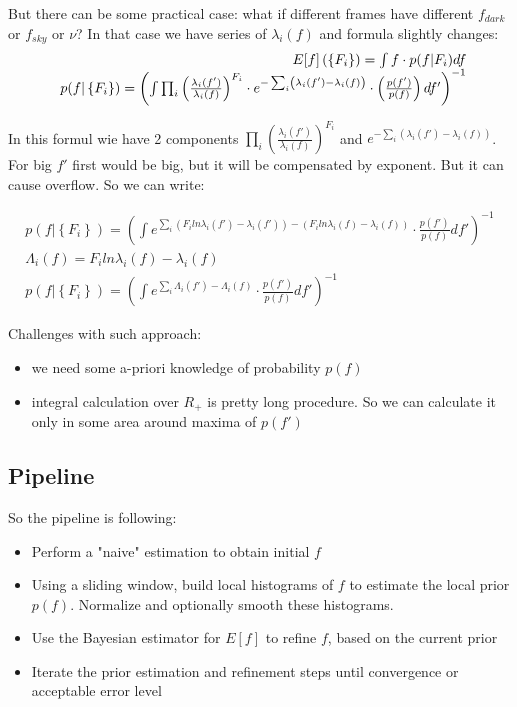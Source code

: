 \documentclass{article}
\begin{document}
But there can be some practical case: what if different frames have different $f_{dark}$ or $f_{sky}$ or $\nu$? In that case we have series
of $\lambda_i(f)$ and formula slightly changes:
\begin{equation}
\begin{array}{r@{}l}
    E[f]\left( \left\{ F_i \right\} \right) = \int f \cdot p(f | {F_i}) df \\
    p(f | \left\{ F_i \right\}) = \left( \int \prod_i \left( \frac{\lambda_i(f')}{\lambda_i(f)} \right)^{F_i} \cdot 
    e^{-\sum_i \left(\lambda_i(f')-\lambda_i(f)\right)} \cdot \left( \frac{p(f')}{p(f)} \right) df'\right)^{-1}
\end{array}
\end{equation}

In this formul wie have 2 components $\prod_i \left( \frac{\lambda_i(f')}{\lambda_i(f)} \right)^{F_i}$ and
$e^{-\sum_i \left(\lambda_i(f')-\lambda_i(f)\right)}$. For big $f'$ first would be big, but it will be compensated by exponent.
But it can cause overflow. So we can write:

\begin{eqnarray}
    p(f | \left\{ F_i \right\}) = \left( \int e^{\sum_i \left( F_i ln \lambda_i(f') - \lambda_i(f')\right) 
            - \left( F_i ln \lambda_i(f) - \lambda_i(f)\right)} \cdot \frac{p(f')}{p(f)} df' \right)^{-1} \label{eq:bayes3} \\[9pt]
    \Lambda_i(f) = F_i ln \lambda_i(f) - \lambda_i(f) \\[9pt]
    p(f | \left\{ F_i \right\}) = \left( \int e^{\sum_i \Lambda_i(f') - \Lambda_i(f) }\cdot \frac{p(f')}{p(f)} df' \right)^{-1}
\end{eqnarray}



Challenges with such approach:
\begin{itemize}
\item we need some a-priori knowledge of probability $p(f)$
\item integral calculation over $R_{+}$ is pretty long procedure. So we can calculate it only in some area around maxima of $p(f')$
\end{itemize}

\subsection{Pipeline}
So the pipeline is following:

\begin{itemize}
    \item Perform a "naive" estimation to obtain initial $f$
    \item Using a sliding window, build local histograms of $f$ to estimate the local prior $p(f)$. Normalize and optionally smooth these histograms.
    \item Use the Bayesian estimator for $E\left[ f \right]$ to refine $f$, based on the current prior
    \item Iterate the prior estimation and refinement steps until convergence or acceptable error level
\end{itemize}
\end{document}
